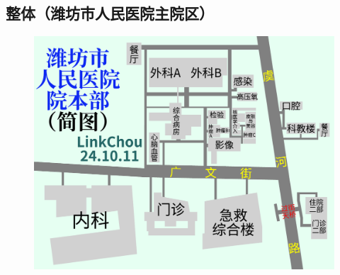 \subsection[整体（潍坊市人民医院主院区）]{整体（潍坊市人民医院主院区）}
\begin{figure}[H]
    \centering
    \vspace{2em}
    \includegraphics*[angle=90,width=\textwidth]{resources/map/人民医院-矢量.pdf}
    \label{map_yuhe_renmin_hospital}
\end{figure}

\newpage
